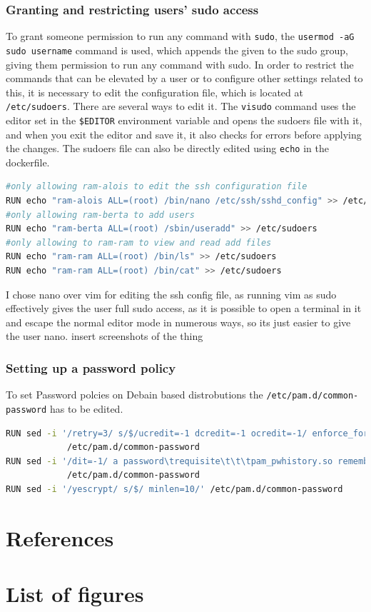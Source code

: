 \documentclass[a4paper]{article}
\newcommand{\abc}{\hfill \break}
\begin{document}
\subsubsection{Granting and restricting users' sudo access}
To grant someone permission to run any command with \texttt{sudo}, the \texttt{usermod -aG sudo username} command is used, which appends the given to the sudo group, giving them permission to run any command with sudo. \abc
In order to restrict the commands that can be elevated by a user or to configure other settings related to this, it is necessary to edit the configuration file, which is located at \texttt{/etc/sudoers}.\abc
There are several ways to edit it. The \texttt{visudo} command uses the editor set in the \texttt{\$EDITOR} environment variable and opens the sudoers file with it, and when you exit the editor and save it, it also checks for errors before applying the changes.
The sudoers file can also be directly edited using \texttt{echo} in the dockerfile.
\begin{lstlisting}[language=bash]
#only allowing ram-alois to edit the ssh configuration file
RUN echo "ram-alois ALL=(root) /bin/nano /etc/ssh/sshd_config" >> /etc/sudoers
#only allowing ram-berta to add users
RUN echo "ram-berta ALL=(root) /sbin/useradd" >> /etc/sudoers
#only allowing to ram-ram to view and read add files
RUN echo "ram-ram ALL=(root) /bin/ls" >> /etc/sudoers
RUN echo "ram-ram ALL=(root) /bin/cat" >> /etc/sudoers
\end{lstlisting}
I chose nano over vim for editing the ssh config file, as running vim as sudo effectively gives the user full sudo access, as it is possible to open a terminal in it and escape the normal editor mode in numerous ways, so its just easier to give the user nano.\abc
insert screenshots of the thing
\subsubsection{Setting up a password policy}
To set Password polcies on Debain based distrobutions the \texttt{/etc/pam.d/common-password} has to be edited.
\begin{lstlisting}[language=bash]
RUN sed -i '/retry=3/ s/$/ucredit=-1 dcredit=-1 ocredit=-1/ enforce_for_root'\
            /etc/pam.d/common-password
RUN sed -i '/dit=-1/ a password\trequisite\t\t\tpam_pwhistory.so remember=5 use_authtok'\
            /etc/pam.d/common-password
RUN sed -i '/yescrypt/ s/$/ minlen=10/' /etc/pam.d/common-password
\end{lstlisting}

\newpage
\section{References}

\newpage
\section{List of figures}

\listoffigures
\end{document}
